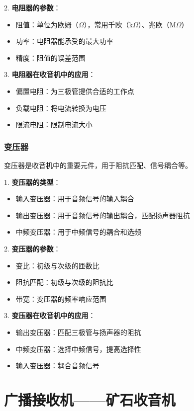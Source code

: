 \documentclass[12pt,UTF8]{ctexbook}
\begin{document}
2. \textbf{电阻器的参数}：
   \begin{itemize}[leftmargin=3.5em]
   \item 阻值：单位为欧姆（$\Omega$），常用千欧（k$\Omega$）、兆欧（M$\Omega$）
   \item 功率：电阻器能承受的最大功率
   \item 精度：阻值的误差范围
   \end{itemize}

3. \textbf{电阻器在收音机中的应用}：
   \begin{itemize}[leftmargin=3.5em]
   \item 偏置电阻：为三极管提供合适的工作点
   \item 负载电阻：将电流转换为电压
   \item 限流电阻：限制电流大小
   \end{itemize}

\section{变压器}

变压器是收音机中的重要元件，用于阻抗匹配、信号耦合等。

1. \textbf{变压器的类型}：
   \begin{itemize}[leftmargin=3.5em]
   \item 输入变压器：用于音频信号的输入耦合
   \item 输出变压器：用于音频信号的输出耦合，匹配扬声器阻抗
   \item 中频变压器：用于中频信号的耦合和选频
   \end{itemize}

2. \textbf{变压器的参数}：
   \begin{itemize}[leftmargin=3.5em]
   \item 变比：初级与次级的匝数比
   \item 阻抗匹配：初级与次级的阻抗比
   \item 带宽：变压器的频率响应范围
   \end{itemize}

3. \textbf{变压器在收音机中的应用}：
   \begin{itemize}[leftmargin=3.5em]
   \item 输出变压器：匹配三极管与扬声器的阻抗
   \item 中频变压器：选择中频信号，提高选择性
   \item 输入变压器：耦合音频信号
   \end{itemize}

\part{广播接收机——矿石收音机}
\end{document}
